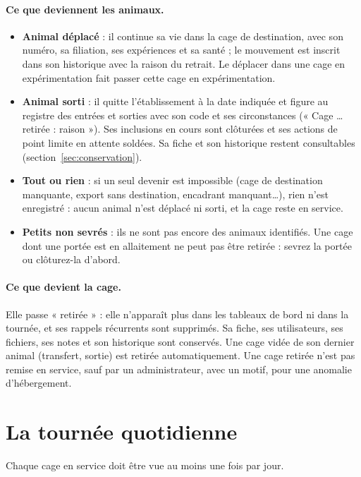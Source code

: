 \documentclass[11pt,a4paper]{article}
\begin{document}
\paragraph{Ce que deviennent les animaux.}
\begin{itemize}
  \item \textbf{Animal déplacé} : il continue sa vie dans la cage de
    destination, avec son numéro, sa filiation, ses expériences et sa santé ;
    le mouvement est inscrit dans son historique avec la raison du retrait.
    Le déplacer dans une cage en expérimentation fait passer cette cage en
    expérimentation.
  \item \textbf{Animal sorti} : il quitte l'établissement à la date indiquée
    et figure au registre des entrées et sorties avec son code et ses
    circonstances (« Cage … retirée : raison »). Ses inclusions en cours sont
    clôturées et ses actions de point limite en attente soldées. Sa fiche
    et son historique restent consultables
    (section~\ref{sec:conservation}).
  \item \textbf{Tout ou rien} : si un seul devenir est impossible (cage de
    destination manquante, export sans destination, encadrant manquant…),
    rien n'est enregistré : aucun animal n'est déplacé ni sorti, et la cage
    reste en service.
  \item \textbf{Petits non sevrés} : ils ne sont pas encore des animaux
    identifiés. Une cage dont une portée est en allaitement ne peut pas être
    retirée : sevrez la portée ou clôturez-la d'abord.
\end{itemize}

\paragraph{Ce que devient la cage.} Elle passe « retirée » : elle
n'apparaît plus dans les tableaux de bord ni dans la tournée, et ses rappels
récurrents sont supprimés. Sa fiche, ses utilisateurs, ses fichiers, ses
notes et son historique sont conservés. Une cage vidée de son dernier animal
(transfert, sortie) est retirée automatiquement. Une cage retirée n'est pas
remise en service, sauf par un administrateur, avec un motif, pour une
anomalie d'hébergement.

\section{La tournée quotidienne}\label{sec:tournee}
Chaque cage en service doit être vue au moins une fois par jour.
\end{document}

